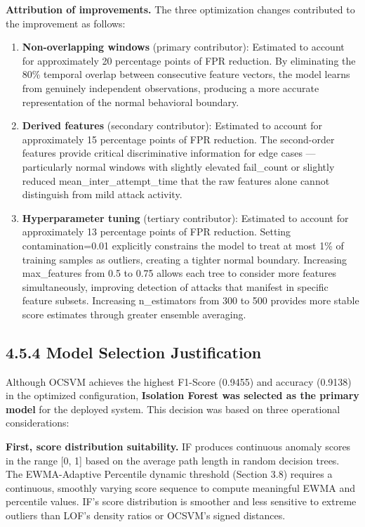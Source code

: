 \documentclass[
  a4paper]{report}
\begin{document}
\textbf{Attribution of improvements.} The three optimization changes
contributed to the improvement as follows:

\begin{enumerate}
\def\labelenumi{\arabic{enumi}.}
\item
  \textbf{Non-overlapping windows} (primary contributor): Estimated to
  account for approximately 20 percentage points of FPR reduction. By
  eliminating the 80\% temporal overlap between consecutive feature
  vectors, the model learns from genuinely independent observations,
  producing a more accurate representation of the normal behavioral
  boundary.
\item
  \textbf{Derived features} (secondary contributor): Estimated to
  account for approximately 15 percentage points of FPR reduction. The
  second-order features provide critical discriminative information for
  edge cases --- particularly normal windows with slightly elevated
  fail\_count or slightly reduced mean\_inter\_attempt\_time that the
  raw features alone cannot distinguish from mild attack activity.
\item
  \textbf{Hyperparameter tuning} (tertiary contributor): Estimated to
  account for approximately 13 percentage points of FPR reduction.
  Setting contamination=0.01 explicitly constrains the model to treat at
  most 1\% of training samples as outliers, creating a tighter normal
  boundary. Increasing max\_features from 0.5 to 0.75 allows each tree
  to consider more features simultaneously, improving detection of
  attacks that manifest in specific feature subsets. Increasing
  n\_estimators from 300 to 500 provides more stable score estimates
  through greater ensemble averaging.
\end{enumerate}

\subsection{4.5.4 Model Selection
Justification}\label{model-selection-justification}

Although OCSVM achieves the highest F1-Score (0.9455) and accuracy
(0.9138) in the optimized configuration, \textbf{Isolation Forest was
selected as the primary model} for the deployed system. This decision
was based on three operational considerations:

\textbf{First, score distribution suitability.} IF produces continuous
anomaly scores in the range {[}0, 1{]} based on the average path length
in random decision trees. The EWMA-Adaptive Percentile dynamic threshold
(Section 3.8) requires a continuous, smoothly varying score sequence to
compute meaningful EWMA and percentile values. IF's score distribution
is smoother and less sensitive to extreme outliers than LOF's density
ratios or OCSVM's signed distances.
\end{document}

